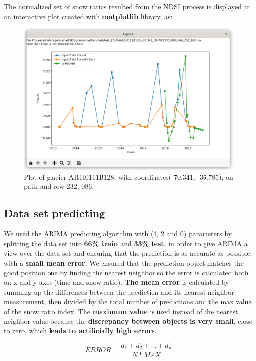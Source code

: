 \documentclass[12pt, a4paper]{report}
\begin{document}
	The normalized set of snow ratios resulted from the NDSI process is displayed in an interactive plot created with \textbf{matplotlib} library, as:
	
	\begin{figure}[H]
		\centering
		\includegraphics[scale=1.5]{plot_1.png}
		\caption{Plot of glacier AR1I0111B128, with coordinates(-70.341, -36.785), on path and row 232, 086.}
		\label{fig:plot_1}
	\end{figure}
	
	\subsection{Data set predicting}
	
	We used the ARIMA predicting algorithm with (4, 2 and 0) parameters \cite{arima_parameters} by splitting the data set into \textbf{66\% train} and \textbf{33\% test}, in order to give ARIMA a view over the data set and ensuring that the prediction is as accurate as possible, with a \textbf{small mean error}. We ensured that the prediction object matches the good position one by finding the nearest neighbor so the error is calculated both on x and y axes (time and snow ratio). 
	\textbf{The mean error} is calculated by summing up the differences between the prediction and its nearest neighbor measurement, then divided by the total number of predictions and the max value of the snow ratio index. The \textbf{maximum value} is used instead of the nearest neighbor value because the \textbf{discrepancy between objects is very small}, close to zero, which \textbf{leads to artificially high errors}.
	
	\[ ERROR = \frac{d_{1} + d_{2} + ... + d_{n}}{N * MAX} \] 
	
\end{document}
